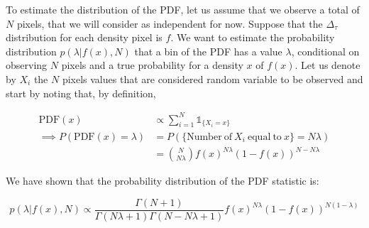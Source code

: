 To estimate the distribution of the PDF, let us assume that we observe a total of $N$ pixels, that we will consider as independent for now. Suppose that the $\Delta_\tau$ distribution for each density pixel is $f$. We want to estimate the probability distribution $p(\lambda |f(x),N )$ that a bin of the PDF has a value $\lambda$, conditional on observing $N$ pixels and a true probability for a density $x$ of $f(x)$. Let us denote by $X_i$ the $N$ pixels values that are considered random variable to be observed and start by noting that, by definition,

\begin{align}
    \mathrm{PDF} (x)& \propto \sum_{i=1}^N \mathds{1}_{\{X_i=x \}}\\
    \implies P(\mathrm{PDF}(x)=\lambda)&=P(\{ \mathrm{Number\ of\ } X_i \mathrm{\ equal\ to\ } x\}=N\lambda)\\
    &= \binom{N}{N\lambda}f(x)^{N\lambda}(1-f(x))^{N-N\lambda}
\end{align}





We have shown that the probability distribution of the PDF statistic is:

\begin{equation}\label{eq:PDF of PDF}
    p(\lambda |f(x),N )\propto \frac{\Gamma(N+1)}{\Gamma(N\lambda+1)\Gamma(N-N\lambda+1)} f(x)^{N\lambda}(1-f(x))^{N(1-\lambda)}
\end{equation}

